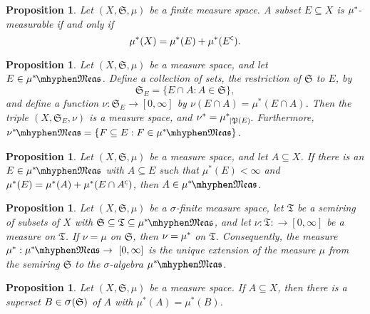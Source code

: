 \documentclass[
twoside=true,
paper=letter,
fontsize=11pt,
pagesize=auto,
leqno,
openany,
headsepline,
overfullrule,
]{scrbook}
\theoremstyle{plain}
\theoremstyle{plain}
\newtheorem{prop}[thm]{Proposition}
\theoremstyle{definition}
\theoremstyle{bfnoteitalic}
\theoremstyle{bfnoteroman}
\newcommand{\sigalg}[1]{\mathfrak{#1}}
\newcommand{\sagb}{\mathop{\hbox{\large{$\sigma$}}}\nolimits}
\newcommand{\textsigma}{\hbox{\large{$\sigma$}}\kern-1pt}
\newcommand{\restrictedto}[1]{_{\lvert#1}\kern-1.5pt}
\newcommand{\comp}{^{\hbox{\tiny{$\mathsf C$}}}}
\newcommand{\meets}{\cap}
\newcommand{\semiring}{\sigalg{S}}
\newcommand{\semiringii}{\sigalg{T}}
\newcommand{\powerset}{\mathfrak{P}}
\newcommand{\measurable}[1]{{#1}\mhyphen\mathfrak{Meas}}
\newcommand{\kernast}{\ast\kern-1pt}
\newcommand{\measurespace}{X}
\newcommand{\measure}{\mu}
\newcommand{\measureii}{\nu}
\begin{document}
\begin{prop}
Let $(\measurespace, \semiring, \measure)$ be a finite measure space.  
A subset $E\subseteq \measurespace$ is $\measure^\kernast$\hyp{}measurable if and only if 
\[
\measure^*(\measurespace) = \measure^*(E) + \measure^*(E\comp).
\]
\end{prop}



\begin{prop}
Let $(\measurespace, \semiring, \measure)$ be a measure space, and let 
$E\in \measurable{\measure^\kernast}$. Define a collection of sets, the restriction of $\semiring$ to $E$, by
\[
\semiring_E = \{ E\meets A: A\in\semiring \},
\]
and define a function $\measureii:\semiring_E\to [0,\infty]$ by $\measureii(E\meets A)=\measure^*(E\meets A)$.
Then the triple $(\measurespace, \semiring_E, \measureii )$ is a measure space, and 
$\measureii^* ={\measure^\kernast}\restrictedto{\powerset(E)}$. Furthermore, 
$\measurable{\measureii^\kernast} 
= 
\{ F\subseteq E : F\in \measurable{\measure^\kernast} \}$.
\end{prop}


\begin{prop}\label{sufficient_for_measurability}
Let $(\measurespace, \semiring, \measure)$ be a measure space, and let $A \subseteq \measurespace$.  If there is an $E\in\measurable{\measure^\kernast}$ with $A\subseteq E$ such that $\measure^*(E) < \infty$ and $\measure^*(E) = \measure^*(A) + \measure^*(E\meets A\comp)$, then 
$A\in\measurable{\measure^\kernast}$.
\end{prop}



\begin{prop}\label{extension_measure}
Let $(\measurespace, \semiring, \measure)$ be a \textsigma-finite measure space, let $\semiringii$ be a semiring of subsets of $\measurespace$ with 
$\semiring \subseteq \semiringii\subseteq\measurable{\measure^\kernast}$,
and let $\measureii:\semiringii:\to [0,\infty]$ be a measure on $\semiringii$.
If $\measureii=\measure$ on $\semiring$, then $\measureii = \measure^\kernast$ on $\semiringii$.
Consequently, the measure 
$\measure^* : \measurable{\measure^\kernast} \to\ [0, \infty]$ 
is the unique extension of the measure $\measure$ from the semiring $\semiring$ 
to the \textsigma\hyp{}algebra 
$\measurable{\measure^\kernast}$.
\end{prop}


\begin{prop}\label{approximation_sigma_algebra}
Let $(\measurespace, \semiring, \measure)$ be a measure space. If 
$A\subseteq\measurespace$, then there is a superset 
$B\in \sagb(\semiring)$ of $A$ with $\measure^*(A) = \measure^*(B)$.
\end{prop}
\end{document}
